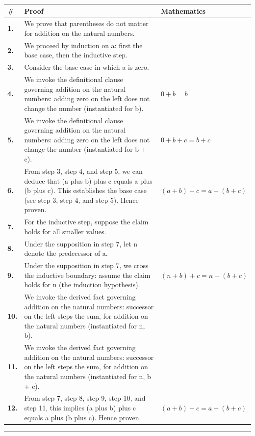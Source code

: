 \documentclass[11pt]{article}
\theoremstyle{definition}
\begin{document}
\begin{tabular}{@{} >{\raggedright\arraybackslash}p{} >{\raggedright\arraybackslash}p{} >{\raggedleft\arraybackslash}p{} @{}}
\textbf{\#} & \textbf{Proof} & \textbf{Mathematics} \\
\midrule
\textbf{1.} & We prove that parentheses do not matter for addition on the natural numbers. & \\[0.45em]
\textbf{2.} & We proceed by induction on a: first the base case, then the inductive step. & \\[0.45em]
\textbf{3.} & Consider the base case in which a is zero. & \\[0.45em]
\textbf{4.} & We invoke the definitional clause governing addition on the natural numbers: adding zero on the left does not change the number (instantiated for b). & $\displaystyle 0 + b = b$ \\[0.45em]
\textbf{5.} & We invoke the definitional clause governing addition on the natural numbers: adding zero on the left does not change the number (instantiated for b + c). & $\displaystyle 0 + b + c = b + c$ \\[0.45em]
\textbf{6.} & From step 3, step 4, and step 5, we can deduce that (a plus b) plus c equals a plus (b plus c). This establishes the base case (see step 3, step 4, and step 5). Hence proven. & $\displaystyle (a + b) + c = a + (b + c)$ \\[0.45em]
\textbf{7.} & For the inductive step, suppose the claim holds for all smaller values. & \\[0.45em]
\textbf{8.} & Under the supposition in step 7, let n denote the predecessor of a. & \\[0.45em]
\textbf{9.} & Under the supposition in step 7, we cross the inductive boundary: assume the claim holds for n (the induction hypothesis). & $\displaystyle (n + b) + c = n + (b + c)$ \\[0.45em]
\textbf{10.} & We invoke the derived fact governing addition on the natural numbers: successor on the left steps the sum, for addition on the natural numbers (instantiated for n, b). & \\[0.45em]
\textbf{11.} & We invoke the derived fact governing addition on the natural numbers: successor on the left steps the sum, for addition on the natural numbers (instantiated for n, b + c). & \\[0.45em]
\textbf{12.} & From step 7, step 8, step 9, step 10, and step 11, this implies (a plus b) plus c equals a plus (b plus c). Hence proven. & $\displaystyle (a + b) + c = a + (b + c)$ \\[0.45em]
\bottomrule
\end{tabular}
\label{thm:Nat-addition-parentheses_do_not_matter}
\par\medskip\hrule
\end{document}
